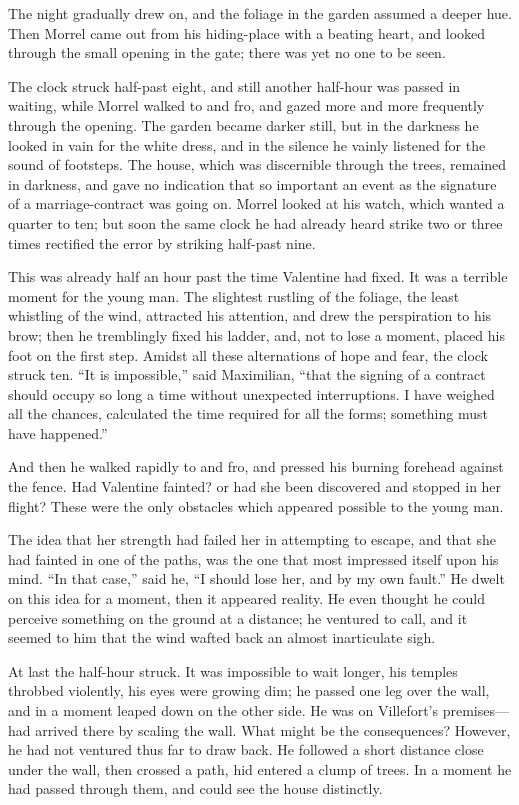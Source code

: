 The night gradually drew on, and the foliage in the garden assumed a
deeper hue. Then Morrel came out from his hiding-place with a beating
heart, and looked through the small opening in the gate; there was yet
no one to be seen.

The clock struck half-past eight, and still another half-hour was
passed in waiting, while Morrel walked to and fro, and gazed more and
more frequently through the opening. The garden became darker still,
but in the darkness he looked in vain for the white dress, and in the
silence he vainly listened for the sound of footsteps. The house, which
was discernible through the trees, remained in darkness, and gave no
indication that so important an event as the signature of a
marriage-contract was going on. Morrel looked at his watch, which
wanted a quarter to ten; but soon the same clock he had already heard
strike two or three times rectified the error by striking half-past
nine.

This was already half an hour past the time Valentine had fixed. It was
a terrible moment for the young man. The slightest rustling of the
foliage, the least whistling of the wind, attracted his attention, and
drew the perspiration to his brow; then he tremblingly fixed his
ladder, and, not to lose a moment, placed his foot on the first step.
Amidst all these alternations of hope and fear, the clock struck ten.
“It is impossible,” said Maximilian, “that the signing of a contract
should occupy so long a time without unexpected interruptions. I have
weighed all the chances, calculated the time required for all the
forms; something must have happened.”

And then he walked rapidly to and fro, and pressed his burning forehead
against the fence. Had Valentine fainted? or had she been discovered
and stopped in her flight? These were the only obstacles which appeared
possible to the young man.

The idea that her strength had failed her in attempting to escape, and
that she had fainted in one of the paths, was the one that most
impressed itself upon his mind. “In that case,” said he, “I should lose
her, and by my own fault.” He dwelt on this idea for a moment, then it
appeared reality. He even thought he could perceive something on the
ground at a distance; he ventured to call, and it seemed to him that
the wind wafted back an almost inarticulate sigh.

At last the half-hour struck. It was impossible to wait longer, his
temples throbbed violently, his eyes were growing dim; he passed one
leg over the wall, and in a moment leaped down on the other side. He
was on Villefort’s premises—had arrived there by scaling the wall. What
might be the consequences? However, he had not ventured thus far to
draw back. He followed a short distance close under the wall, then
crossed a path, hid entered a clump of trees. In a moment he had passed
through them, and could see the house distinctly.

